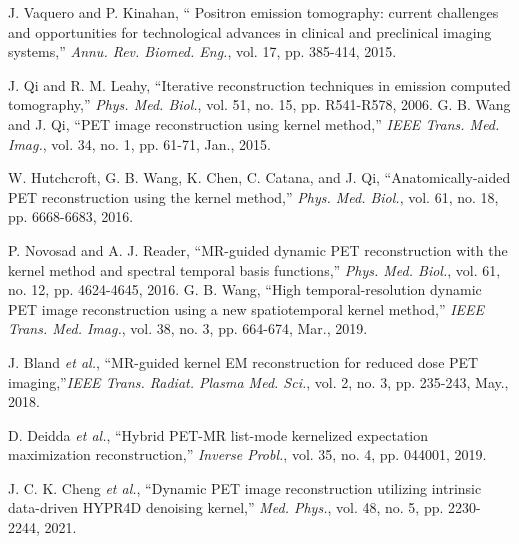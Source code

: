 \documentclass[]{IEEETran}
\begin{document}
	\begin{thebibliography}{00}
		 J. Vaquero and P. Kinahan, `` Positron emission tomography: current challenges and opportunities for technological advances in clinical and preclinical imaging systems,'' \emph{Annu. Rev. Biomed. Eng.}, vol. 17, pp. 385-414, 2015.
		
		 J. Qi and R. M. Leahy, ``Iterative reconstruction techniques in emission computed tomography,'' \emph{Phys. Med. Biol.}, vol. 51, no. 15, pp. R541-R578, 2006.
		  G. B. Wang and J. Qi, ``PET image reconstruction using kernel method,'' \emph{IEEE Trans. Med. Imag.}, vol. 34, no. 1, pp. 61-71, Jan., 2015.
		
		 W. Hutchcroft, G. B. Wang, K. Chen, C. Catana, and J. Qi, ``Anatomically-aided PET reconstruction using the kernel method,'' \emph{Phys. Med. Biol.}, vol. 61, no. 18, pp. 6668-6683, 2016.
		
		 P. Novosad and A. J. Reader, ``MR-guided dynamic PET reconstruction with the kernel method and spectral temporal basis functions,'' \emph{Phys. Med. Biol.}, vol. 61, no. 12, pp. 4624-4645, 2016.
		  G. B. Wang, ``High temporal-resolution dynamic PET image
		reconstruction using a new spatiotemporal kernel method,'' \emph{IEEE Trans. Med. Imag.}, vol. 38, no. 3, pp. 664-674, Mar., 2019.
		
		 J. Bland \emph{et al.}, ``MR-guided kernel EM reconstruction for reduced dose PET imaging,''\emph{IEEE Trans. Radiat. Plasma Med. Sci.}, vol. 2, no. 3, pp. 235-243, May., 2018.
		
		 D. Deidda \emph{et al.}, ``Hybrid PET-MR list-mode kernelized expectation maximization reconstruction,'' \emph{Inverse Probl.}, vol. 35, no. 4, pp. 044001, 2019.
		
		 J. C. K. Cheng \emph{et al.}, ``Dynamic PET image reconstruction utilizing intrinsic data-driven HYPR4D denoising kernel,'' \emph{Med.    Phys.}, vol. 48, no. 5, pp. 2230-2244, 2021.
		

\end{thebibliography}
\end{document}
